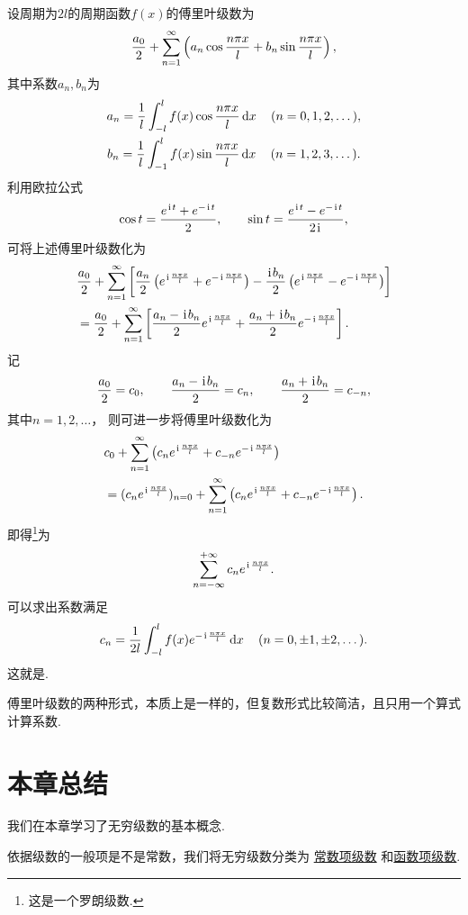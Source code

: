 设周期为\(2l\)的周期函数\(f(x)\)的傅里叶级数为\[
	\frac{a_0}{2} + \s \left( a_n \cos\f + b_n \sin\f \right),
\]
其中系数\(a_n,b_n\)为\begin{gather*}
	a_n = \frac{1}{l} \int_{-l}^{l} f(x) \cos\f \dd{x}
	\quad(n=0,1,2,\dotsc), \\
	b_n = \frac{1}{l} \int_{-1}^{l} f(x) \sin\f \dd{x}
	\quad(n=1,2,3,\dotsc).
\end{gather*}
利用欧拉公式\[
	\cos t = \frac{e^{\iu t}+e^{-\iu t}}{2},
	\qquad
	\sin t = \frac{e^{\iu t}-e^{-\iu t}}{2\iu},
\]
可将上述傅里叶级数化为\[
	\begin{split}
		&\frac{a_0}{2} + \s \left[
			\frac{a_n}{2} \left( \eif{} + \eif- \right)
			-\frac{\iu b_n}{2} \left( \eif{} - \eif- \right)
		\right] \\
		&= \frac{a_0}{2} + \s \left[
			\frac{a_n - \iu b_n}{2} \eif{}
			+ \frac{a_n + \iu b_n}{2} \eif-
		\right].
	\end{split}
\]
记\[
	\frac{a_0}{2} = c_0,
	\qquad
	\frac{a_n-\iu b_n}{2} = c_n,
	\qquad
	\frac{a_n+\iu b_n}{2} = c_{-n},
\]
其中\(n=1,2,\dotsc\)，
则可进一步将傅里叶级数化为\[
	\begin{split}
		&c_0 + \s \left(
			c_n \eif{} + c_{-n} \eif-
		\right) \\
		&= (c_n \eif{})_{n=0}
		+ \s \left(
			c_n \eif{} + c_{-n} \eif-
	\right).
\end{split}
\]
即得\footnote{这是一个罗朗级数.}为
\begin{equation}\label{equation:无穷级数.傅里叶级数的复数形式}
	\sum\limits_{n=-\infty}^{+\infty} c_n \eif{}.
\end{equation}
可以求出系数满足
\begin{equation}\label{equation:无穷级数.傅里叶系数的复数形式}
	c_n = \frac{1}{2l} \int_{-l}^l f(x) \eif- \dd{x}
	\quad(n=0,\pm1,\pm2,\dotsc).
\end{equation}
这就是.

傅里叶级数的两种形式，本质上是一样的，但复数形式比较简洁，且只用一个算式计算系数.
\endgroup

\section{本章总结}

我们在本章学习了无穷级数的基本概念.

依据级数的一般项是不是常数，我们将无穷级数分类为%
\hyperref[definition:无穷级数.常数项级数的定义]{常数项级数}%
和\hyperref[definition:无穷级数.实函数项级数的概念]{函数项级数}.

